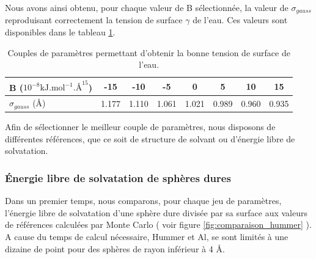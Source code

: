 Nous avons ainsi obtenu, pour chaque valeur de B sélectionnée, la valeur de $\sigma_{gauss}$ reproduisant correctement la tension de surface $\gamma$ de l'eau. Ces valeurs sont disponibles dans le tableau \ref{tab:parametres_bridge}.

\begin{table}[H]
 \centering
  \begin{tabular}{l || c c c c c c c}
    \hline
    B ($10^{-8} \mathrm{kJ.mol}^{-1}.\text{\AA}^{15}$)  & -15 & -10 & -5 & 0 & 5 & 10 & 15  \\
    \hline
     $\sigma_{gauss}$ (\AA)  & 1.177 & 1.110 & 1.061 & 1.021 & 0.989 & 0.960 & 0.935  \\
    \hline
  \end{tabular}
  \caption{Couples de paramètres permettant d'obtenir la bonne tension de surface de l'eau.}
  \label{tab:parametres_bridge}  
\end{table}

Afin de sélectionner le meilleur couple de paramètres, nous disposons de différentes références, que ce soit de structure de solvant ou d'énergie libre de solvatation. 


\subsubsection{\'Energie libre de solvatation de sphères dures}
Dans un premier temps, nous comparons, pour chaque jeu de paramètres, l'\'energie libre de solvatation d'une sphère dure divisée par sa surface aux valeurs de références calculées par Monte Carlo\cite{hummer_information_1996} ( voir figure \ref{fig:comparaison_hummer} ). A cause du temps de calcul nécessaire, Hummer et Al\cite{hummer_information_1996}, se sont limités à une dizaine de point pour des sphères de rayon inférieur à 4 \AA.



